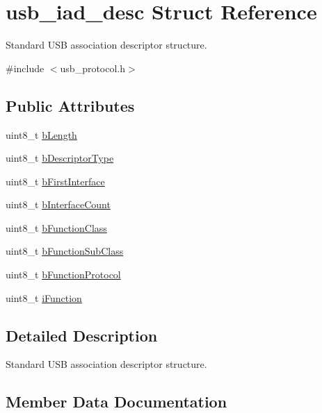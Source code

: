 \hypertarget{structusb__iad__desc}{}\section{usb\+\_\+iad\+\_\+desc Struct Reference}
\label{structusb__iad__desc}


Standard U\+SB association descriptor structure.  




{\ttfamily \#include $<$usb\+\_\+protocol.\+h$>$}

\subsection*{Public Attributes}
\begin{DoxyCompactItemize}
\item 
uint8\+\_\+t \hyperlink{structusb__iad__desc_afd6d58806e3bf63b00d3b56ef3df0a41}{b\+Length}
\item 
uint8\+\_\+t \hyperlink{structusb__iad__desc_ad8aa03d5053b5b6940b3b5ebe83fa6d5}{b\+Descriptor\+Type}
\item 
uint8\+\_\+t \hyperlink{structusb__iad__desc_af8dd823bb4394ec6964b836118f990ed}{b\+First\+Interface}
\item 
uint8\+\_\+t \hyperlink{structusb__iad__desc_afa291ce945a183562d154a0d9918ff74}{b\+Interface\+Count}
\item 
uint8\+\_\+t \hyperlink{structusb__iad__desc_a80d23133725f8e0ce2527cdd9fb3cb47}{b\+Function\+Class}
\item 
uint8\+\_\+t \hyperlink{structusb__iad__desc_acece89234e03f1f869c8a36b3f4ee6f2}{b\+Function\+Sub\+Class}
\item 
uint8\+\_\+t \hyperlink{structusb__iad__desc_a3ac4fa77ac68255f0134656a5a458110}{b\+Function\+Protocol}
\item 
uint8\+\_\+t \hyperlink{structusb__iad__desc_a99c7398765df8c1efa6f8e9972e8886c}{i\+Function}
\end{DoxyCompactItemize}


\subsection{Detailed Description}
Standard U\+SB association descriptor structure. 

\subsection{Member Data Documentation}
\mbox{\label{structusb__iad__desc_ad8aa03d5053b5b6940b3b5ebe83fa6d5}} 
